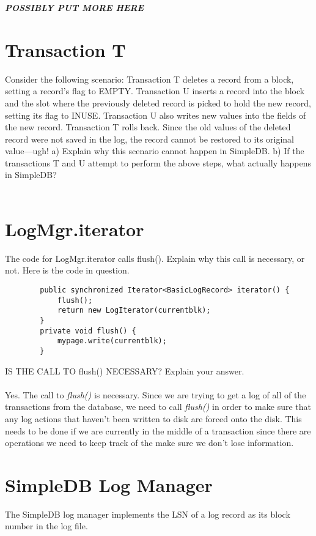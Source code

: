 \documentclass [letter,12pt] {article}
\begin{document}
    \textit{\textbf{POSSIBLY PUT MORE HERE}}


\section{Transaction T}
    Consider the following scenario: Transaction T deletes a record from a
    block, setting a record’s flag to EMPTY. Transaction U inserts a 
    record into the block and the slot where the previously deleted 
    record is picked to hold the new record, setting its flag to INUSE. 
    Transaction U also writes new values into the fields of the new record. 
    Transaction T rolls back. Since the old values of the deleted record 
    were not saved in the log, the record cannot be restored to its original 
    value—ugh! a) Explain why this scenario cannot happen in SimpleDB. 
    b) If the transactions T and U attempt to perform the above steps, what 
    actually happens in SimpleDB?
    \\
    \\

\section{LogMgr.iterator}
    The code for LogMgr.iterator calls flush(). Explain why this call is 
    necessary, or not. Here is the code in question.

    \begin{verbatim}
        public synchronized Iterator<BasicLogRecord> iterator() {
            flush();
            return new LogIterator(currentblk);
        }
        private void flush() {
            mypage.write(currentblk);
        }
    \end{verbatim}
    IS THE CALL TO flush() NECESSARY? Explain your answer.
    \\
    \\
    Yes. The call to \textit{flush()} is necessary. Since we are trying
    to get a log of all of the transactions from the database, we need
    to call \textit{flush()} in order to make sure that any log actions
    that haven't been written to disk are forced onto the disk. This 
    needs to be done if we are currently in the middle of a transaction
    since there are operations we need to keep track of the make sure
    we don't lose information.


\section{SimpleDB Log Manager}
    The SimpleDB log manager implements the LSN of a log record as its 
    block number in the log file.
\end{document}
